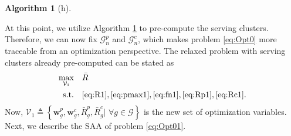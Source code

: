 \documentclass[12pt,draftcls,onecolumn]{IEEEtran}
\newtheorem{algorithm}{Algorithm}
\theoremstyle{remark}
\theoremstyle{definition}
\begin{document}
{\begin{algorithm}[h]
\begin{spacing}{1}
	\end{spacing}
	\label{alg_clust}
\end{algorithm}%
\indent At this point, we utilize Algorithm \ref{alg_clust} to pre-compute the serving clusters. Therefore, we can now fix $\mathcal{G}_n^p$ and $\mathcal{G}_n^c$, which makes problem \eqref{eq:Opt0} more traceable from an optimization perspective. The relaxed problem with serving clusters already pre-computed can be stated as
\begin{subequations}\label{eq:Opt01}
	\begin{align}
		\underset{\mathcal{V}_1}{\text{max}}\quad &\bar{R}  \\
		\text{s.t.} \quad & \eqref{eq:R1}, \eqref{eq:pmax1}, \eqref{eq:fn1}, \eqref{eq:Rp1}, \eqref{eq:Rc1}.
	\end{align}
\end{subequations}  
Now, $\mathcal{V}_1 \triangleq \left\lbrace \mathbf{w}_{g}^p, \mathbf{w}_{g}^c, \bar{R}_{g}^{p}, \bar{R}_{g}^{c}|\,\, \forall g \in \mathcal{G}\right\rbrace$ is the new set of optimization variables. Next, we describe the SAA of problem \eqref{eq:Opt01}.
}
\end{document}

